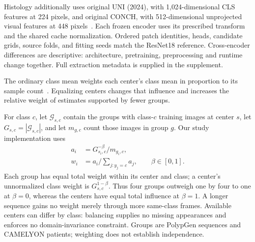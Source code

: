 Histology additionally uses original UNI (2024), with 1,024-dimensional CLS features at 224 pixels, and original CONCH, with 512-dimensional unprojected visual features at 448 pixels~\cite{chen2024uni,lu2024conch}. Each frozen encoder uses its prescribed transform and the shared cache normalization. Ordered patch identities, heads, candidate grids, source folds, and fitting seeds match the ResNet18 reference. Cross-encoder differences are descriptive: architecture, pretraining, preprocessing and runtime change together. Full extraction metadata is supplied in the supplement.

The ordinary class mean weights each center's class mean in proportion to its sample count~\cite{snell2017prototypical}. Equalizing centers changes that influence and increases the relative weight of estimates supported by fewer groups.

For class $c$, let $\mathcal G_{s,c}$ contain the groups with class-$c$ training images at center $s$, let $G_{s,c}=|\mathcal G_{s,c}|$, and let $m_{g,c}$ count those images in group $g$. Our study implementation uses
\begin{equation}
\begin{aligned}
    a_i &= G_{s_i,c}^{-\beta}/m_{g_i,c},\\
    w_i &= a_i\Big/\sum_{j:y_j=c}a_j, \qquad \beta\in[0,1].
\end{aligned}
\label{eq:cbmp_weights}
\end{equation}
Each group has equal total weight within its center and class; a center's unnormalized class weight is $G_{s,c}^{1-\beta}$. Thus four groups outweigh one by four to one at $\beta=0$, whereas the centers have equal total influence at $\beta=1$. A longer sequence gains no weight merely through more same-class frames. Available centers can differ by class: balancing supplies no missing appearances and enforces no domain-invariance constraint. Groups are PolypGen sequences and CAMELYON patients; weighting does not establish independence.

